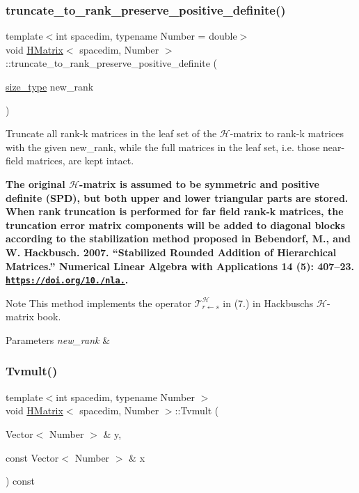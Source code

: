 \subsubsection{\texorpdfstring{truncate\+\_\+to\+\_\+rank\+\_\+preserve\+\_\+positive\+\_\+definite()}{truncate\_to\_rank\_preserve\_positive\_definite()}}
{\footnotesize\ttfamily template$<$int spacedim, typename Number = double$>$ \\
void \hyperlink{classHMatrix}{H\+Matrix}$<$ spacedim, Number $>$\+::truncate\+\_\+to\+\_\+rank\+\_\+preserve\+\_\+positive\+\_\+definite (\begin{DoxyParamCaption}\item[{\hyperlink{classHMatrix_a5ca8dc549783d38371a01ecd621ecb34}{size\+\_\+type}}]{new\+\_\+rank }\end{DoxyParamCaption})}

Truncate all rank-\/k matrices in the leaf set of the $\mathcal{H}$-\/matrix to rank-\/k matrices with the given {\ttfamily new\+\_\+rank}, while the full matrices in the leaf set, i.\+e. those near-\/field matrices, are kept intact.

{\bfseries The original $\mathcal{H}$-\/matrix is assumed to be symmetric and positive definite (S\+PD), but both upper and lower triangular parts are stored. When rank truncation is performed for far field rank-\/k matrices, the truncation error matrix components will be added to diagonal blocks according to the stabilization method proposed in Bebendorf, M., and W. Hackbusch. 2007. “\+Stabilized Rounded Addition of Hierarchical Matrices.\+” Numerical Linear Algebra with Applications 14 (5)\+: 407–23. \href{https://doi.org/10.1002/nla.525}{\tt https\+://doi.\+org/10./nla.}.}


\begin{DoxyDescription}
\item[Note ]This method implements the operator $\mathcal{T}_{r \leftarrow s}^{\mathcal{H}}$ in (7.) in Hackbusch\textquotesingle{}s $\mathcal{H}$-\/matrix book. 
\end{DoxyDescription}
\begin{DoxyParams}{Parameters}
{\em new\+\_\+rank} & \\
\hline
\end{DoxyParams}
\mbox{\label{classHMatrix_a72e5255eb5ce46136d0e2b195c82f016}} 
\subsubsection{\texorpdfstring{Tvmult()}{Tvmult()}\hspace{0.1cm}{\footnotesize\ttfamily [1/4]}}
{\footnotesize\ttfamily template$<$int spacedim, typename Number $>$ \\
void \hyperlink{classHMatrix}{H\+Matrix}$<$ spacedim, Number $>$\+::Tvmult (\begin{DoxyParamCaption}\item[{Vector$<$ Number $>$ \&}]{y,  }\item[{const Vector$<$ Number $>$ \&}]{x }\end{DoxyParamCaption}) const}

